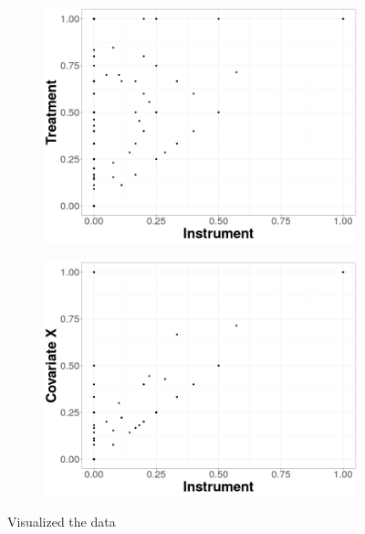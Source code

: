 \documentclass{scrartcl}
\begin{document}
\begin{figure}
  \begin{subfigure}{.5\textwidth}
    \centering
    \includegraphics[width=.95\linewidth]{replication/output/D_on_Z.png}
    \label{fig:sfig1}
  \end{subfigure}%
  \begin{subfigure}{.5\textwidth}
    \centering
    \includegraphics[width=.95\linewidth]{replication/output/X_on_Z.png}
    \label{fig:sfig2}
  \end{subfigure}
  \caption{Visualized the data}
  \label{fig:the_data}
\end{figure}
\end{document}
